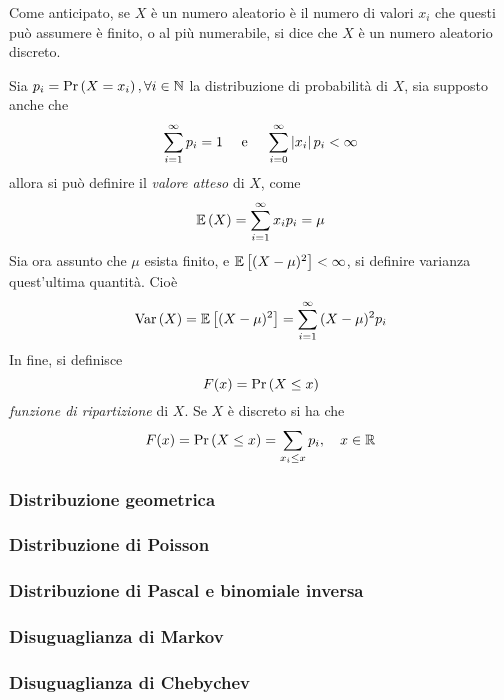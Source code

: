 \documentclass{subfiles}
\begin{document}
Come anticipato, se \(X\) è un numero aleatorio è il numero di valori \(x_{i}\) che questi può assumere è finito, o al più numerabile,
si dice che \(X\) è un numero aleatorio discreto.

Sia \(p_{i} = \Prob{X = x_{i}}, \forall i \in \Natural\) la distribuzione di probabilità di \(X\), sia supposto anche che
\[
    \Sum{p_i}{i = 1}[\infty] = 1 \quad \text{e} \quad \Sum{\Abs{x_{i}} p_i}{i = 0}[\infty] < \infty
\]
allora si può definire il \emph{valore atteso} di \(X\), come
\[
    \Expected{X} = \Sum{x_{i} p_{i}}{i = 1}[\infty] = \mu
\]
Sia ora assunto che \(\mu\) esista finito, e \(\Expected*{(X - \mu)^{2}} < \infty\), si definire varianza quest'ultima quantità.
Cioè
\[
    \Var{X} = \Expected*{(X - \mu)^{2}} = \Sum{(X - \mu)^{2} p_{i}}{i = 1}[\infty]
\]
In fine, si definisce
\[
    F(x) = \Prob{X \le x}
\]
\emph{funzione di ripartizione} di \(X\). Se \(X\) è discreto si ha che
\[
    F(x) = \Prob{X \le x} = \Sum{p_{i}}{x_{i} \le x}, \quad x \in \Real
\]

\subsubsection{Distribuzione geometrica}


\subsubsection{Distribuzione di Poisson}


\subsubsection{Distribuzione di Pascal e binomiale inversa}


\subsubsection{Disuguaglianza di Markov}


\subsubsection{Disuguaglianza di Chebychev}

\end{document}
